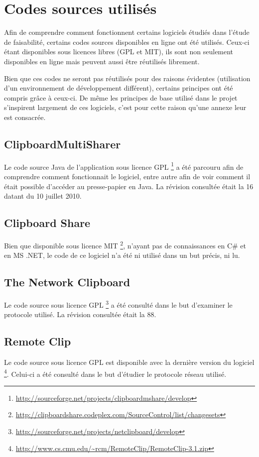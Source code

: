 \chapter{Codes sources utilisés}\label{ann:src}
\renewcommand{\leftmark}{ANNEXE \thechapter.~~Codes sources utilisés}
\label{annexe1}

Afin de comprendre comment fonctionnent certains logiciels étudiés dans
l'étude de faisabilité, certains codes sources disponibles en ligne
ont été utilisés. Ceux-ci étant disponibles sous licences libres (GPL et MIT),
ils sont non seulement disponibles en ligne mais peuvent aussi être
réutilisés librement.

Bien que ces codes ne seront pas réutilisés pour des raisons évidentes
(utilisation d'un environnement de développement différent), certains
principes ont été compris grâce à ceux-ci. De même les principes de base
utilisé dans le projet s'inspirent largement de ces logiciels, c'est pour
cette raison qu'une annexe leur est consacrée.

\section*{ClipboardMultiSharer}
Le code source Java de l'application sous licence GPL
\footnote{\url{http://sourceforge.net/projects/clipboardmshare/develop}}
a été parcouru afin de comprendre comment fonctionnait
le logiciel, entre autre afin de voir comment il était possible d'accéder
au presse-papier en Java.
La révision consultée était la 16 datant du 10 juillet 2010.

\section*{Clipboard Share}
Bien que disponible sous licence MIT
\footnote{\url{http://clipboardshare.codeplex.com/SourceControl/list/changesets}}, n'ayant pas de connaissances en C\# et en MS .NET, le code de ce logiciel
n'a été ni utilisé dans un but précis, ni lu.

\section*{The Network Clipboard}
Le code source sous licence GPL
\footnote{\url{http://sourceforge.net/projects/netclipboard/develop}}
a été consulté dans le but d'examiner le protocole utilisé. La révision
consultée était la 88.

\section*{Remote Clip}
Le code source sous licence GPL est disponible avec la dernière version
du logiciel
\footnote{\url{http://www.cs.cmu.edu/~rcm/RemoteClip/RemoteClip-3.1.zip}}.
Celui-ci a été consulté dans le but d'étudier le protocole réseau utilisé.

